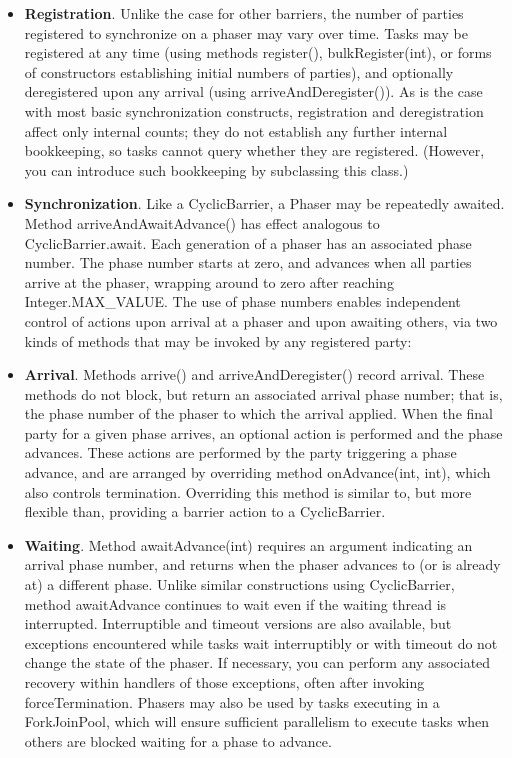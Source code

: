 \documentclass{article}
\begin{document}
\begin{itemize}
    \item \textbf{Registration}. Unlike the case for other barriers, the number of parties registered to synchronize on a phaser may vary over time. Tasks may be registered at any time (using methods register(), bulkRegister(int), or forms of constructors establishing initial numbers of parties), and optionally deregistered upon any arrival (using arriveAndDeregister()). As is the case with most basic synchronization constructs, registration and deregistration affect only internal counts; they do not establish any further internal bookkeeping, so tasks cannot query whether they are registered. (However, you can introduce such bookkeeping by subclassing this class.)
    \item \textbf{Synchronization}. Like a CyclicBarrier, a Phaser may be repeatedly awaited. Method arriveAndAwaitAdvance() has effect analogous to CyclicBarrier.await. Each generation of a phaser has an associated phase number. The phase number starts at zero, and advances when all parties arrive at the phaser, wrapping around to zero after reaching Integer.MAX\_VALUE. The use of phase numbers enables independent control of actions upon arrival at a phaser and upon awaiting others, via two kinds of methods that may be invoked by any registered party:
    \item \textbf{Arrival}. Methods arrive() and arriveAndDeregister() record arrival. These methods do not block, but return an associated arrival phase number; that is, the phase number of the phaser to which the arrival applied. When the final party for a given phase arrives, an optional action is performed and the phase advances. These actions are performed by the party triggering a phase advance, and are arranged by overriding method onAdvance(int, int), which also controls termination. Overriding this method is similar to, but more flexible than, providing a barrier action to a CyclicBarrier.
    \item \textbf{Waiting}. Method awaitAdvance(int) requires an argument indicating an arrival phase number, and returns when the phaser advances to (or is already at) a different phase. Unlike similar constructions using CyclicBarrier, method awaitAdvance continues to wait even if the waiting thread is interrupted. Interruptible and timeout versions are also available, but exceptions encountered while tasks wait interruptibly or with timeout do not change the state of the phaser. If necessary, you can perform any associated recovery within handlers of those exceptions, often after invoking forceTermination. Phasers may also be used by tasks executing in a ForkJoinPool, which will ensure sufficient parallelism to execute tasks when others are blocked waiting for a phase to advance.

\end{itemize}
\end{document}
